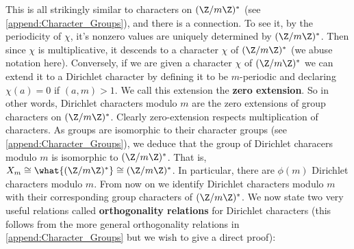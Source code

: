       This is all strikingly similar to characters on $(\Z/m\Z)^{\ast}$ (see \cref{append:Character_Groups}), and there is a connection. To see it, by the periodicity of $\chi$, it's nonzero values are uniquely determined by $(\Z/m\Z)^{\ast}$. Then since $\chi$ is multiplicative, it descends to a character $\chi$ of $(\Z/m\Z)^{\ast}$ (we abuse notation here). Conversely, if we are given a character $\chi$ of $(\Z/m\Z)^{\ast}$ we can extend it to a Dirichlet character by defining it to be $m$-periodic and declaring $\chi(a) = 0$ if $(a,m) > 1$. We call this extension the \textbf{zero extension}. So in other words, Dirichlet characters modulo $m$ are the zero extensions of group characters on $(\Z/m\Z)^{\ast}$. Clearly zero-extension respects multiplication of characters. As groups are isomorphic to their character groups (see \cref{append:Character_Groups}), we deduce that the group of Dirichlet characers modulo $m$ is isomorphic to $(\Z/m\Z)^{\ast}$. That is, $X_{m} \cong \what{(\Z/m\Z)^{\ast}} \cong (\Z/m\Z)^{\ast}$. In particular, there are $\phi(m)$ Dirichlet characters modulo $m$. From now on we identify Dirichlet characters modulo $m$ with their corresponding group characters of $(\Z/m\Z)^{\ast}$. We now state two very useful relations called \textbf{orthogonality relations} for Dirichlet characters (this follows from the more general orthogonality relations in \cref{append:Character_Groups} but we wish to give a direct proof):

